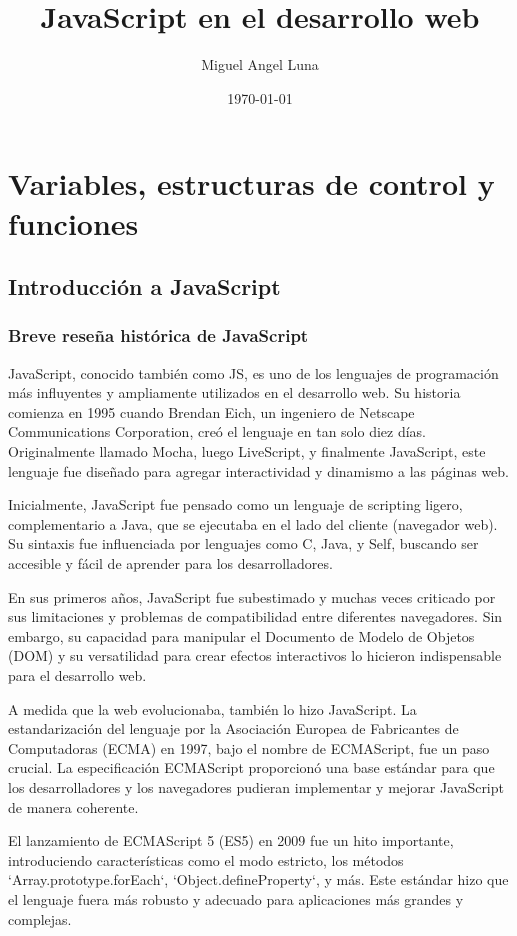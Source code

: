 \documentclass{book}
\title{JavaScript en el desarrollo web}
\author{Miguel Angel Luna}
\affil{Ya Basta! en la Secretaría de Asuntos Académicos}
\date{\today}
\begin{document}
\frontmatter
\maketitle
\newpage
\tableofcontents


\mainmatter


\chapter{Variables, estructuras de control y funciones}
\section{Introducción a JavaScript}
\subsection{Breve reseña histórica de JavaScript}
JavaScript, conocido también como JS, es uno de los lenguajes de programación más influyentes y ampliamente utilizados en el desarrollo web. Su historia comienza en 1995 cuando Brendan Eich, un ingeniero de Netscape Communications Corporation, creó el lenguaje en tan solo diez días. Originalmente llamado Mocha, luego LiveScript, y finalmente JavaScript, este lenguaje fue diseñado para agregar interactividad y dinamismo a las páginas web.

Inicialmente, JavaScript fue pensado como un lenguaje de scripting ligero, complementario a Java, que se ejecutaba en el lado del cliente (navegador web). Su sintaxis fue influenciada por lenguajes como C, Java, y Self, buscando ser accesible y fácil de aprender para los desarrolladores.

En sus primeros años, JavaScript fue subestimado y muchas veces criticado por sus limitaciones y problemas de compatibilidad entre diferentes navegadores. Sin embargo, su capacidad para manipular el Documento de Modelo de Objetos (DOM) y su versatilidad para crear efectos interactivos lo hicieron indispensable para el desarrollo web.

A medida que la web evolucionaba, también lo hizo JavaScript. La estandarización del lenguaje por la Asociación Europea de Fabricantes de Computadoras (ECMA) en 1997, bajo el nombre de ECMAScript, fue un paso crucial. La especificación ECMAScript proporcionó una base estándar para que los desarrolladores y los navegadores pudieran implementar y mejorar JavaScript de manera coherente.

El lanzamiento de ECMAScript 5 (ES5) en 2009 fue un hito importante, introduciendo características como el modo estricto, 
los métodos `Array.prototype.forEach`, `Object.defineProperty`, y más. Este estándar hizo que el lenguaje fuera más robusto y adecuado para aplicaciones más grandes y complejas.
\end{document}
